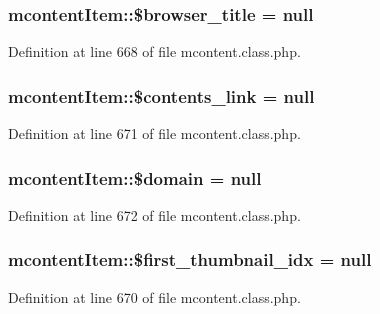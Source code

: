 \subsubsection[{\$browser\+\_\+title}]{\setlength{\rightskip}{0pt plus 5cm}mcontent\+Item\+::\$browser\+\_\+title = null}\label{classmcontentItem_afdef241bedb2d1829475b7bb623cecf7}


Definition at line 668 of file mcontent.\+class.\+php.

\hypertarget{classmcontentItem_afdee32faf59897fa7e02f9ed4389b411}{}
\subsubsection[{\$contents\+\_\+link}]{\setlength{\rightskip}{0pt plus 5cm}mcontent\+Item\+::\$contents\+\_\+link = null}\label{classmcontentItem_afdee32faf59897fa7e02f9ed4389b411}


Definition at line 671 of file mcontent.\+class.\+php.

\hypertarget{classmcontentItem_ad92b662d98d23cb2a10747de7ffdada0}{}
\subsubsection[{\$domain}]{\setlength{\rightskip}{0pt plus 5cm}mcontent\+Item\+::\$domain = null}\label{classmcontentItem_ad92b662d98d23cb2a10747de7ffdada0}


Definition at line 672 of file mcontent.\+class.\+php.

\hypertarget{classmcontentItem_a358e826e3ee863300d43b12a8218a5fa}{}
\subsubsection[{\$first\+\_\+thumbnail\+\_\+idx}]{\setlength{\rightskip}{0pt plus 5cm}mcontent\+Item\+::\$first\+\_\+thumbnail\+\_\+idx = null}\label{classmcontentItem_a358e826e3ee863300d43b12a8218a5fa}


Definition at line 670 of file mcontent.\+class.\+php.

